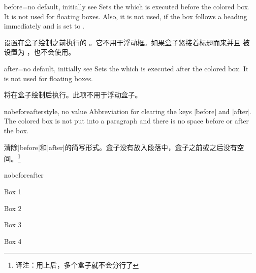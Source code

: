 \begin{docTcbKey}{before}{=}{no default, initially see }
Sets the  which is executed before the colored box.
It is not used for floating boxes.
Also, it is not used, if the box follows a heading immediately
and  is set to .

设置在盒子绘制之前执行的 。它不用于浮动框。如果盒子紧接着标题而来并且  被设置为 ，也不会使用。

\end{docTcbKey}

\begin{docTcbKey}{after}{=}{no default, initially see }
Sets the  which is executed after the colored box.
It is not used for floating boxes.

将在盒子绘制后执行。此项不用于浮动盒子。
\end{docTcbKey}


\begin{docTcbKey}{nobeforeafter}{}{style, no value}
Abbreviation for clearing the keys |before| and |after|. The colored box
is not put into a paragraph and there is no space before or after the box.


清除|before|和|after|的简写形式。盒子没有放入段落中，盒子之前或之后没有空间。\footnote{译注：用上后，多个盒子就不会分行了}
\begin{exdispExample}{nobeforeafter}
\begin{tcolorbox}[myone,title=Box 1]Box 1\end{tcolorbox}%
\begin{tcolorbox}[myone,title=Box 2]Box 2\end{tcolorbox}%
\begin{tcolorbox}[myone,title=Box 3]Box 3\end{tcolorbox}%
\begin{tcolorbox}[myone,title=Box 4]Box 4\end{tcolorbox}
\end{exdispExample}
\end{docTcbKey}



